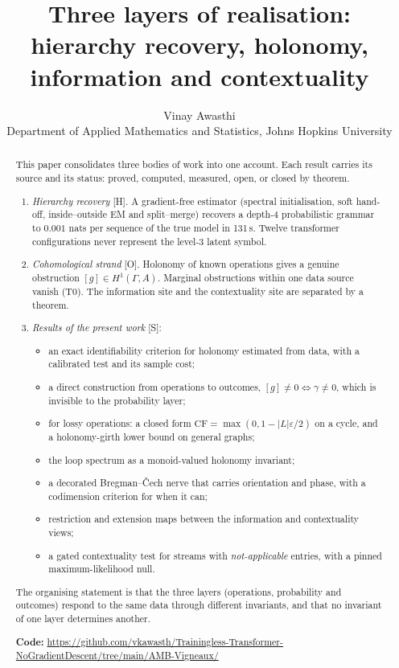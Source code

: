 \documentclass[11pt]{article}
\title{Three layers of realisation:\\ hierarchy recovery, holonomy, information and contextuality}
\author{Vinay Awasthi\\ \small Department of Applied Mathematics and Statistics, Johns Hopkins University}
\date{}
\theoremstyle{definition}
\theoremstyle{remark}
\newcommand{\CF}{\mathrm{CF}}
\newcommand{\src}[1]{\textsf{\small[#1]}}
\begin{document}
\maketitle

\begin{abstract}
This paper consolidates three bodies of work into one account. Each result carries its source and its status: proved, computed, measured, open, or closed by theorem.
\begin{enumerate}
  \item \emph{Hierarchy recovery} \src{H}. A gradient-free estimator (spectral initialisation, soft hand-off, inside--outside EM and split--merge) recovers a depth-4 probabilistic grammar to $0.001$ nats per sequence of the true model in 131\,s. Twelve transformer configurations never represent the level-3 latent symbol.
  \item \emph{Cohomological strand} \src{O}. Holonomy of known operations gives a genuine obstruction $[g]\in H^1(\Gamma,A)$. Marginal obstructions within one data source vanish (T0). The information site and the contextuality site are separated by a theorem.
  \item \emph{Results of the present work} \src{S}:
  \begin{itemize}
    \item an exact identifiability criterion for holonomy estimated from data, with a calibrated test and its sample cost;
    \item a direct construction from operations to outcomes, $[g]\ne0\iff\gamma\ne0$, which is invisible to the probability layer;
    \item for lossy operations: a closed form $\CF=\max(0,1-|L|\varepsilon/2)$ on a cycle, and a holonomy-girth lower bound on general graphs;
    \item the loop spectrum as a monoid-valued holonomy invariant;
    \item a decorated Bregman--\v{C}ech nerve that carries orientation and phase, with a codimension criterion for when it can;
    \item restriction and extension maps between the information and contextuality views;
    \item a gated contextuality test for streams with \emph{not-applicable} entries, with a pinned maximum-likelihood null.
  \end{itemize}
\end{enumerate}
The organising statement is that the three layers (operations, probability and outcomes) respond to the same data through different invariants, and that no invariant of one layer determines another.
\par\smallskip\noindent\textbf{Code:} \url{https://github.com/vkawasth/Trainingless-Transformer-NoGradientDescent/tree/main/AMB-Vigneaux/}
\end{abstract}
\end{document}
